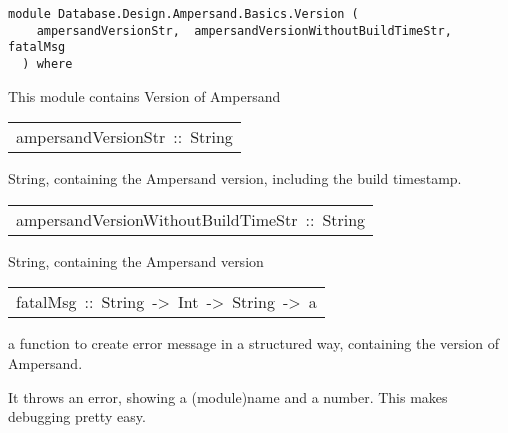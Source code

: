 \label{module:Database.Design.Ampersand.Basics.Version}
\haddockbeginheader
{\haddockverb\begin{verbatim}
module Database.Design.Ampersand.Basics.Version (
    ampersandVersionStr,  ampersandVersionWithoutBuildTimeStr,  fatalMsg
  ) where\end{verbatim}}
\haddockendheader

This module contains Version of Ampersand
\par

\begin{haddockdesc}
\item[\begin{tabular}{@{}l}
ampersandVersionStr\ ::\ String
\end{tabular}]\haddockbegindoc
String, containing the Ampersand version, including the build timestamp.
\par

\end{haddockdesc}
\begin{haddockdesc}
\item[\begin{tabular}{@{}l}
ampersandVersionWithoutBuildTimeStr\ ::\ String
\end{tabular}]\haddockbegindoc
String, containing the Ampersand version
\par

\end{haddockdesc}
\begin{haddockdesc}
\item[\begin{tabular}{@{}l}
fatalMsg\ ::\ String\ ->\ Int\ ->\ String\ ->\ a
\end{tabular}]\haddockbegindoc
a function to create error message in a structured way, containing the version of Ampersand.

   It throws an error, showing a (module)name and a number. This makes debugging pretty easy.
\par

\end{haddockdesc}